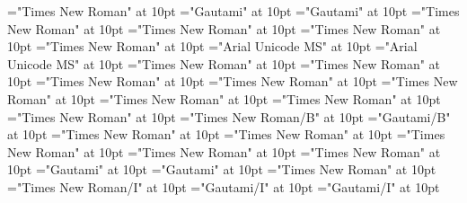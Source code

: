 \documentclass[c5paper,twoside]{article}
\begin{document}
 
\pagestyle{plain} 
\font\spanenentryletDatadicBody="Times New Roman" at 10pt
\font\spantexitemtespanentranslationsexamplessensesensesentryletDatadicBody="Gautami" at 10pt
\font\xitemtespanentranslationsexamplessensesensesentryletDatadicBody="Gautami" at 10pt
\font\spanenspanenspanentranslationsexamplessensesensesentryletDatadicBody="Times New Roman" at 10pt
\font\spanenspanentranslationsexamplessensesensesentryletDatadicBody="Times New Roman" at 10pt
\font\spanentranslationsexamplessensesensesentryletDatadicBody="Times New Roman" at 10pt
\font\spanenLexSensepublishStemGlossPubLesensesensesentryletDatadicBody="Times New Roman" at 10pt
\font\spanhiLexSensepublishStemGlossPubLesensesensesentryletDatadicBody="Arial Unicode MS" at 10pt
\font\LexSensepublishStemGlossPubLesensesensesentryletDatadicBody="Arial Unicode MS" at 10pt
\font\spanenspanenpictureCaptionpictureRightentryletDatadicBody="Times New Roman" at 10pt
\font\spanenpictureCaptionpictureRightentryletDatadicBody="Times New Roman" at 10pt
\font\spanenCmPicturepublishStemPileThumbnailPubpictureCaptionpictureRightentryletDatadicBody="Times New Roman" at 10pt
\font\CmPicturepublishStemPileThumbnailPubpictureCaptionpictureRightentryletDatadicBody="Times New Roman" at 10pt
\font\pictureCaptionpictureRightentryletDatadicBody="Times New Roman" at 10pt
\font\picturepictureRightentryletDatadicBody="Times New Roman" at 10pt
\font\pictureRightentryletDatadicBody="Times New Roman" at 10pt
\font\spanencomplexformrefsentryletDatadicBody="Times New Roman" at 10pt
\font\spanencomplexformformcomplexformrefsentryletDatadicBody="Times New Roman/B" at 10pt
\font\complexformformcomplexformrefsentryletDatadicBody="Gautami/B" at 10pt
\font\spanenspanencomplexformtypecomplexformrefsentryletDatadicBody="Times New Roman" at 10pt
\font\spanencomplexformtypecomplexformrefsentryletDatadicBody="Times New Roman" at 10pt
\font\complexformtypecomplexformrefsentryletDatadicBody="Times New Roman" at 10pt
\font\complexformrefsentryletDatadicBody="Times New Roman" at 10pt
\font\spanentranslationLdtranslationsexamplessensesensesentryletDatadicBody="Times New Roman" at 10pt
\font\spantetranslationLdtranslationsexamplessensesensesentryletDatadicBody="Gautami" at 10pt
\font\translationLdtranslationsexamplessensesensesentryletDatadicBody="Gautami" at 10pt
\font\translationsexamplessensesensesentryletDatadicBody="Times New Roman" at 10pt
\font\spanenexampleexamplessensesensesentryletDatadicBody="Times New Roman/I" at 10pt
\font\spanggoTeluINexampleexamplessensesensesentryletDatadicBody="Gautami/I" at 10pt
\font\exampleexamplessensesensesentryletDatadicBody="Gautami/I" at 10pt
\end{document}
